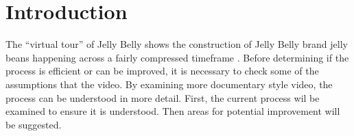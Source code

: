 
\section{Introduction}

The ``virtual tour'' of Jelly Belly shows the construction of Jelly Belly brand jelly beans happening across a fairly compressed timeframe \parencite{sflunchJellyBellyFactory2008} . Before determining if the process is efficient or can be improved, it is necessary to check some of the assumptions that the video. By examining  more documentary style video, the process can be understood in more detail. First, the current process wil be examined to ensure it is understood. Then areas for potential improvement will be suggested.
